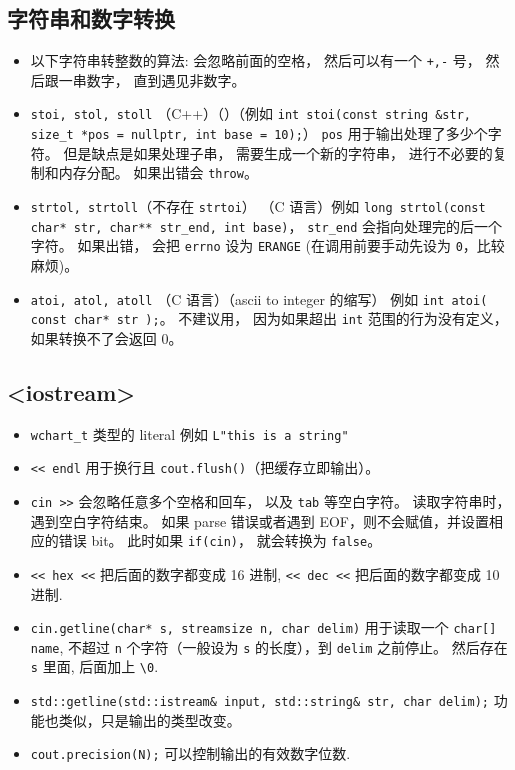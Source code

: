 \subsection{字符串和数字转换}
\begin{itemize}
\item 以下字符串转整数的算法: 会忽略前面的空格， 然后可以有一个 \verb`+,-` 号， 然后跟一串数字， 直到遇见非数字。
\item \verb`stoi, stol, stoll` （C++）（）（例如 \verb`int stoi(const string &str, size_t *pos = nullptr, int base = 10);`） \verb`pos` 用于输出处理了多少个字符。 但是缺点是如果处理子串， 需要生成一个新的字符串， 进行不必要的复制和内存分配。 如果出错会 \verb`throw`。
\item \verb`strtol, strtoll`（不存在 \verb`strtoi`） （C 语言）例如 \verb`long strtol(const char* str, char** str_end, int base)`， \verb`str_end` 会指向处理完的后一个字符。 如果出错， 会把 \verb`errno` 设为 \verb`ERANGE` (在调用前要手动先设为 \verb`0`，比较麻烦)。
\item \verb`atoi, atol, atoll` （C 语言）（ascii to integer 的缩写） 例如 \verb`int atoi( const char* str );`。 不建议用， 因为如果超出 \verb`int` 范围的行为没有定义， 如果转换不了会返回 0。
\end{itemize}

\subsection{<iostream>}
\begin{itemize}
\item \verb`wchart_t` 类型的 literal 例如 \verb`L"this is a string"`
\item \verb`<< endl` 用于换行且 \verb`cout.flush()`（把缓存立即输出）。
\item \verb`cin >>` 会忽略任意多个空格和回车， 以及 \verb`tab` 等空白字符。 读取字符串时，遇到空白字符结束。 如果 parse 错误或者遇到 EOF，则不会赋值，并设置相应的错误 bit。 此时如果 \verb`if(cin)`， 就会转换为 \verb`false`。
\item \verb`<< hex <<` 把后面的数字都变成 16 进制, \verb`<< dec <<` 把后面的数字都变成 10 进制.
\item \verb`cin.getline(char* s, streamsize n, char delim)` 用于读取一个 \verb`char[] name`, 不超过 \verb`n` 个字符（一般设为 \verb`s` 的长度），到 \verb`delim` 之前停止。 然后存在 \verb`s` 里面, 后面加上 \verb`\0`.
\item \verb`std::getline(std::istream& input, std::string& str, char delim);` 功能也类似，只是输出的类型改变。
\item \verb`cout.precision(N);` 可以控制输出的有效数字位数.
\end{itemize}

